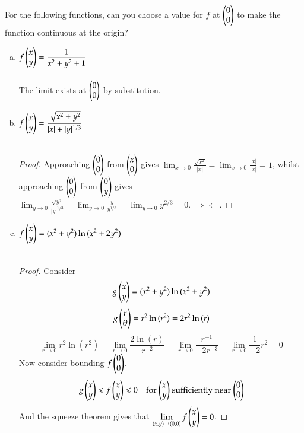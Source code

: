  For the following functions, can you choose a value for $f$ at $\begin{pmatrix} 0 \\ 0 \end{pmatrix}$ to make the function continuous at the origin?

\begin{enumerate}[a.]
  \item $\displaystyle f\begin{pmatrix} x \\ y \end{pmatrix} = \frac{1}{x^2+y^2+1}$ \\
   \\
  The limit exists at $\begin{pmatrix} 0 \\ 0 \end{pmatrix}$ by substitution.

  \item $\displaystyle f\begin{pmatrix} x \\ y \end{pmatrix} = \frac{\sqrt{x^2+y^2}}{|x|+|y|^{1/3}}$ \\
    \\
  \begin{proof}
    Approaching $\begin{pmatrix} 0 \\ 0 \end{pmatrix}$ from $\begin{pmatrix} x \\ 0 \end{pmatrix}$ gives $\displaystyle \lim_{x\rightarrow 0} \frac{\sqrt{x^2}}{|x|} = \lim_{x\rightarrow 0}\frac{|x|}{|x|} = 1$, whilst approaching $\begin{pmatrix} 0 \\ 0 \end{pmatrix}$ from $\begin{pmatrix} 0 \\ y \end{pmatrix}$ gives $\displaystyle \lim_{y\rightarrow 0} \frac{\sqrt{y^2}}{|y|^{1/3}}=\lim_{y\rightarrow 0}\frac{y}{y^{1/3}}=\lim_{y\rightarrow 0}y^{2/3}=0$. $\Rightarrow\!\Leftarrow$.
  \end{proof}

  \item $\displaystyle f\begin{pmatrix} x \\ y \end{pmatrix} = (x^2 + y^2) \ln{(x^2+2y^2)}$ \\
  \\
  \begin{proof}
    Consider
  \[g\begin{pmatrix} x \\ y \end{pmatrix} = (x^2 + y^2) \ln{(x^2+y^2)}\]
  \[g\begin{pmatrix} r \\ \theta \end{pmatrix} = r^2 \ln{(r^2)}=2r^2 \ln{(r)}\]
  \[\lim_{r\rightarrow 0} r^2 \ln{(r^2)} = \lim_{r\rightarrow 0} \frac{2\ln{(r)}}{r^{-2}} = \lim_{r\rightarrow 0} \frac{r^{-1}}{-2r^{-3}} = \lim_{r\rightarrow 0} \frac{1}{-2} r^2=0\]
  Now consider bounding $f\begin{pmatrix} 0 \\ 0 \end{pmatrix}$.
  \[g\begin{pmatrix} x \\ y \end{pmatrix} \leqslant f\begin{pmatrix} x \\ y \end{pmatrix} \leqslant 0 \quad \text{for $\begin{pmatrix} x \\ y \end{pmatrix}$ sufficiently near $\begin{pmatrix} 0 \\ 0 \end{pmatrix}$}\]
  And the squeeze theorem gives that $\displaystyle \lim_{(x,y)\rightarrow (0,0)}f\begin{pmatrix} x \\ y \end{pmatrix} = 0$. \end{proof}


\end{enumerate}

